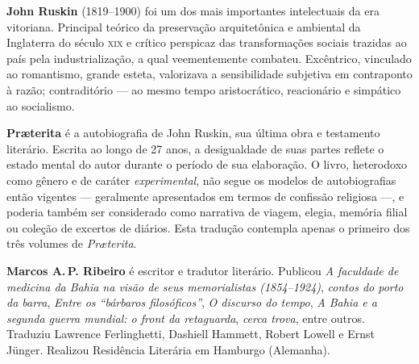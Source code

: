 \textbf{John Ruskin} (1819--1900) foi um dos mais importantes intelectuais da era vitoriana. Principal teórico da preservação arquitetônica e ambiental da Inglaterra do século \textsc{xix} e crítico perspicaz das transformações sociais trazidas ao país pela industrialização, a qual veementemente combateu. Excêntrico, vinculado ao romantismo, grande esteta, valorizava a sensibilidade subjetiva em contraponto à razão; contraditório --- ao mesmo tempo aristocrático, reacionário e simpático ao socialismo.

\textbf{Pr\ae terita} é a autobiografia de John Ruskin, sua última obra e testamento literário. Escrita ao longo de 27 anos, a desigualdade de suas partes reflete o estado mental do autor durante o período de sua elaboração. O livro, heterodoxo como gênero e de caráter \textit{experimental}, não segue os modelos de autobiografias então vigentes --- geralmente apresentados em termos de confissão religiosa ---, e poderia também ser considerado como narrativa de viagem, elegia, memória filial ou coleção de excertos de diários. Esta tradução contempla apenas o primeiro dos três volumes de \textit{Pr\ae terita}.

\textbf{Marcos A.\,P. Ribeiro} é escritor e tradutor literário. Publicou \textit{A faculdade de medicina da Bahia na visão de seus memorialistas (1854--1924)}, \textit{contos do porto da barra}, \textit{Entre os “bárbaros filosóficos”}, \textit{O discurso do tempo}, \textit{A Bahia e a segunda guerra mundial: o front da retaguarda}, \textit{cerca trova}, entre outros. Traduziu Lawrence Ferlinghetti, Dashiell Hammett, Robert Lowell e Ernst Jünger. Realizou Residência Literária em Hamburgo (Alemanha).





